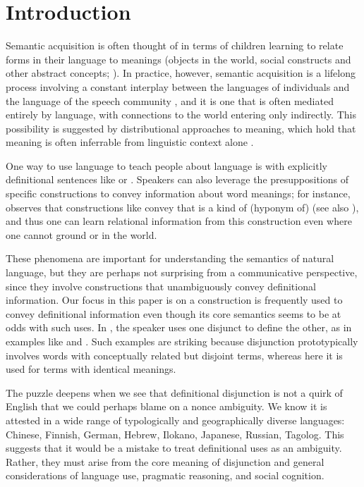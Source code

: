 \section{Introduction}\label{sec:intro}

Semantic acquisition is often thought of in terms of children learning
to relate forms in their language to meanings (objects in the world,
social constructs and other abstract concepts;
\citealt{Frank:Goodman:Tenenbaum:2009}). In practice, however, semantic
acquisition is a lifelong process involving a constant interplay
between the languages of individuals and the language of the speech
community \citep{Lewis75LL}, and it is one that is often mediated
entirely by language, with connections to the world entering only
indirectly. This possibility is suggested by distributional approaches
to meaning, which hold that meaning is often inferrable from
linguistic context alone \citep{TurneyPantel10}.

One way to use language to teach people about language is with
explicitly definitional sentences like  or . Speakers can also leverage the presuppositions of
specific constructions to convey information about word meanings; for
instance, \citet{Hearst92} observes that constructions like  convey that  is a kind of (hyponym of) 
(see also \citealt{SnowEtAl05}), and thus one can learn relational
information from this construction even where one cannot ground
 or  in the world.

These phenomena are important for understanding the semantics of
natural language, but they are perhaps not surprising from a
communicative perspective, since they involve constructions that
unambiguously convey definitional information.  Our focus in this
paper is on a construction is frequently used to convey definitional
information even though its core semantics seems to be at odds with
such uses.  In , the speaker uses one
disjunct to define the other, as in examples like  and . Such examples are
striking because disjunction prototypically involves words with
conceptually related but disjoint terms, whereas here it is used for
terms with identical meanings.  

The puzzle deepens when we see that definitional disjunction is not a
quirk of English that we could perhaps blame on a nonce ambiguity.  We
know it is attested in a wide range of typologically and
geographically diverse languages: Chinese, Finnish, German, Hebrew,
Ilokano, Japanese, Russian, Tagolog.  This suggests that it would be a
mistake to treat definitional uses as an ambiguity. Rather, they must
arise from the core meaning of disjunction and general considerations
of language use, pragmatic reasoning, and social cognition.

